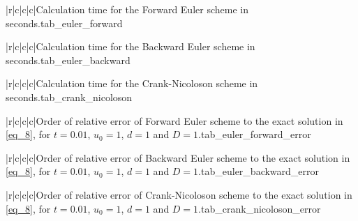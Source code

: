 \documentclass[11pt,english,a4paper]{article}
\begin{document}
\begin{flushleft}
\begin{tabell}{|r|c|c|c|}{\small}{}{}{Calculation time for the Forward Euler scheme in seconds.}{tab_euler_forward}
\end{tabell}

\begin{tabell}{|r|c|c|c|}{\small}{}{}{Calculation time for the Backward Euler scheme in seconds.}{tab_euler_backward}
\end{tabell}

\begin{tabell}{|r|c|c|c|}{\small}{}{}{Calculation time for the Crank-Nicoloson scheme in seconds.}{tab_crank_nicoloson}
\end{tabell}

\begin{tabell}{|r|c|c|c|}{\small}{}{}{Order of relative error of Forward Euler scheme to the exact solution in \eqref{eq_8}, for $t=0.01$, $u_0 = 1$, $d = 1$ and $D = 1$.}{tab_euler_forward_error}
\end{tabell}

\begin{tabell}{|r|c|c|c|}{\small}{}{}{Order of relative error of Backward Euler scheme to the exact solution in \eqref{eq_8}, for $t=0.01$, $u_0 = 1$, $d = 1$ and $D = 1$.}{tab_euler_backward_error}
\end{tabell}

\begin{tabell}{|r|c|c|c|}{\small}{}{}{Order of relative error of Crank-Nicoloson scheme to the exact solution in \eqref{eq_8}, for $t=0.01$, $u_0 = 1$, $d = 1$ and $D = 1$.}{tab_crank_nicoloson_error}
\end{tabell}



\end{flushleft}
\end{document}
